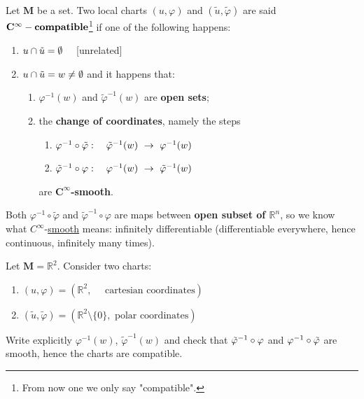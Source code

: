\documentclass[../main.tex]{subfiles}
\begin{document}
\begin{definition}
Let $\mathbf{M}$ be a set. Two local charts $(u,\varphi)$ and $(\tilde{u},\tilde\varphi)$ are said $\mathbf{C}^\infty-\textrm{\textbf{compatible}}$\footnote{From now one we only say "compatible".} if one of the following happens:
\begin{enumerate}
    \item $u\cap\Tilde{u}=\emptyset \quad$ [unrelated]
    \item \(u\cap\Tilde{u}=w\neq\emptyset\) and it happens that:
    \begin{enumerate}
        \item \(\varphi^{-1}(w)\) and $\tilde{\varphi}^{-1}(w)$ are \textbf{open sets};
        \item the \textbf{change of coordinates}, namely the steps
        \begin{enumerate}
            \item $\varphi^{-1}\circ\Tilde{\varphi}: \quad \Tilde{\varphi}^{-1}(w) \ \rightarrow \ \varphi^{-1}(w)$
            \item $\Tilde{\varphi}^{-1}\circ{\varphi}: \quad {\varphi}^{-1}(w) \ \rightarrow \ \Tilde{\varphi}^{-1}(w)$
        \end{enumerate}
        are $\mathbf{C}^\infty$\textbf{-smooth}.
    \end{enumerate}
\end{enumerate}
\end{definition}
\begin{kaobox}[frametitle=Notice]
Both $\varphi^{-1}\circ\tilde{\varphi}$ and $\tilde{\varphi}^{-1}\circ\varphi$ are maps between \textbf{open subset of $\mathbb{R}^n$}, so we know what $C^\infty$-\href{https://it.wikipedia.org/wiki/Funzione_liscia}{smooth} means: infinitely differentiable (differentiable everywhere, hence continuous, infinitely many times).
\end{kaobox}
\begin{exercise}[easy]
Let $\mathbf{M}=\mathbb{R}^2$. Consider two charts:
\begin{enumerate}
    \item \((u,\varphi)=(\mathbb{R}^2, \quad \textrm{ cartesian coordinates})\)
    \item \((\tilde{u},\tilde{\varphi})=(\mathbb{R}^2\setminus\{0\}, \textrm{ polar coordinates})\)
\end{enumerate}
Write explicitly $\varphi^{-1}(w)$, $\tilde{\varphi}^{-1}(w)$ and check that $\Tilde{\varphi}^{-1}\circ{\varphi}$ and $\varphi^{-1}\circ\Tilde{\varphi}$ are smooth, hence the charts are compatible.
\end{exercise}
\end{document}
